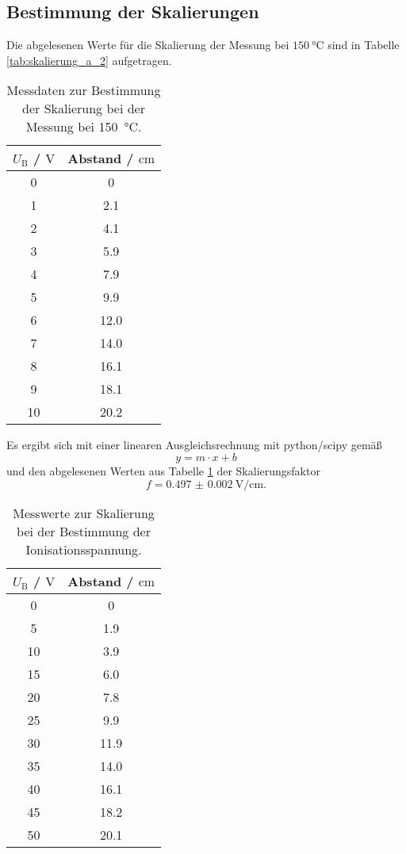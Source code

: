 \subsection{Bestimmung der Skalierungen}
Die abgelesenen Werte für die Skalierung der Messung bei $\SI{150}{\celsius}$ sind in
Tabelle \ref{tab:skalierung_a_2} aufgetragen.
\begin{table}
	\centering
	\caption{Messdaten zur Bestimmung der Skalierung bei der Messung bei \SI{150}{\celsius}.}
	\label{tab:a_2}
	\begin{tabular}{cc}
		\toprule
		$U_{\mathrm{B}}$ / $\si{\volt}$ & Abstand / $\si{\centi\meter}$ \\
		\midrule
		0 & 0 \\
		1 & 2.1 \\
		2 & 4.1 \\
		3 & 5.9 \\
		4 & 7.9 \\
		5 & 9.9 \\
		6 & 12.0 \\
		7 & 14.0 \\
		8 & 16.1 \\
		9 & 18.1 \\
		10 & 20.2 \\
		\bottomrule
	\end{tabular}
\end{table}
Es ergibt sich mit einer linearen Ausgleichsrechnung mit python/scipy \cite{scipy} gemäß
\begin{equation*}
	y = m \cdot x + b
\end{equation*}
 und den abgelesenen Werten aus Tabelle \ref{tab:a_2} der Skalierungsfaktor
\begin{equation*}
	f = \SI{0.497(2)}{\volt\per\centi\meter} \mathrm{.}
\end{equation*}
\begin{table}
	\centering
	\caption{Messwerte zur Skalierung bei der Bestimmung der Ionisationsspannung.}
	\label{tab:c}
	\begin{tabular}{cc}
		\toprule
		$U_{\mathrm{B}}$ / $\si{\volt}$ & Abstand / $\si{\centi\meter}$ \\
		\midrule
		0 & 0 \\
		5 & 1.9 \\
		10 & 3.9 \\
		15 & 6.0 \\
		20 & 7.8 \\
		25 & 9.9 \\
		30 & 11.9 \\
		35 & 14.0 \\
		40 & 16.1 \\
		45 & 18.2 \\
		50 & 20.1 \\
		\bottomrule
	\end{tabular}
\end{table}
